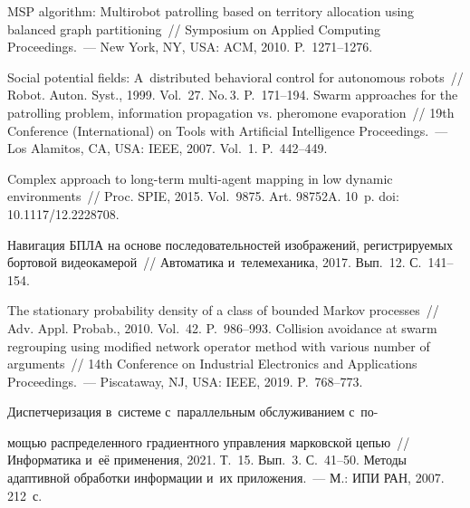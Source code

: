 \begin{multicols}{2}
{{\begin{thebibliography}{99}
 MSP algorithm: Multirobot patrolling based on territory allocation 
using balanced graph partitioning~//  Symposium on Applied Computing Proceedings.~--- 
New York, NY, USA: ACM, 2010. P.~1271--1276.



 Social potential fields: A~distributed behavioral control for autonomous 
robots~// Robot. Auton. Syst., 1999. Vol.~27. No.\,3. P.~171--194. 
 Swarm 
approaches for the patrolling problem, information propagation vs. pheromone evaporation~// 
19th  Conference (International) on Tools with Artificial Intelligence Proceedings.~--- Los 
Alamitos, CA, USA: IEEE, 2007. Vol.~1. P.~442--449. 

 Complex approach to long-term multi-agent mapping in low 
dynamic environments~// Proc. SPIE,  2015. Vol.~9875. Art. 98752A. 10~p. doi: 10.1117/12.2228708.

 Навигация БПЛА на 
основе последовательностей изоб\-ра\-же\-ний, ре\-гист\-ри\-ру\-емых бортовой видеокамерой~// 
Автоматика и~телемеханика, 2017. Вып.~12. С.~141--154. 

 The stationary probability density of a class of bounded Markov 
processes~// Adv. Appl. Probab., 2010. Vol.~42. P.~986--993. 
 Collision avoidance at swarm regrouping 
using modified network operator method with various number of arguments~// 14th Conference 
on Industrial Electronics and Applications Proceedings.~--- Piscataway, NJ, USA: IEEE, 2019. 
P.~768--773. 



 Диспетчеризация в~сис\-те\-ме с~параллельным 
обслуживанием с~по-\linebreak\vspace*{-12pt}

\pagebreak

\noindent
мощью распределенного градиентного управ\-ле\-ния марковской 
цепью~// Информатика и~её применения, 2021. Т.~15. Вып.~3. С.~41--50. 
 Методы адаптивной обработки информации и~их приложения.~--- 
М.: ИПИ РАН, 2007. 212~с. 

\end{thebibliography}

 }
 }

\end{multicols}

